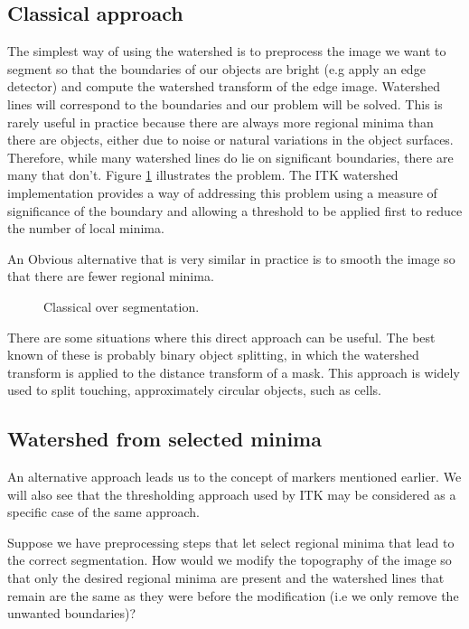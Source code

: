 \documentclass{InsightArticle}
\begin{document}
\subsection{Classical approach}
The simplest way of using the watershed is to preprocess the image we
want to segment so that the boundaries of our objects are bright (e.g
apply an edge detector) and compute the watershed transform of the
edge image. Watershed lines will correspond to the boundaries and our
problem will be solved. This is rarely useful in practice because
there are always more regional minima than there are objects, either
due to noise or natural variations in the object surfaces. Therefore,
while many watershed lines do lie on significant boundaries, there are
many that don't. Figure \ref{fig:overseg} illustrates the problem. The ITK
watershed implementation provides a way of addressing this problem
using a measure of significance of the boundary and allowing a
threshold to be applied first to reduce the number of local minima. 

An Obvious alternative that is very similar in practice is to 
smooth the image so that there are fewer regional minima.
\begin{figure}
\begin{center}
\caption{Classical over segmentation.}
\label{fig:overseg}
\end{center}
\end{figure}

There are some situations where this direct approach can be
useful. The best known of these is probably binary object splitting,
in which the watershed transform is applied to the distance transform
of a mask. This approach is widely used to split touching,
approximately circular objects, such as cells.

\subsection{Watershed from selected minima}
An alternative approach leads us to the concept of markers mentioned
earlier. We will also see that the thresholding approach used by ITK
may be considered as a specific case of the same approach.

Suppose we have preprocessing steps that let select regional minima
that lead to the correct segmentation. How would we modify the
topography of the image so that only the desired regional minima are
present and the watershed lines that remain are the same as they were
before the modification (i.e we only remove the unwanted boundaries)?
\end{document}
